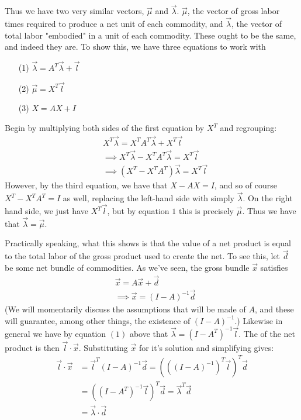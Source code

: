 Thus we have two very similar vectors, $\vec{\mu}$ and $\vec{\lambda}$. $\vec{\mu}$, the vector of gross labor times required to produce a net unit of each commodity, and $\vec{\lambda}$, the vector of total labor "embodied" in a unit of each commodity. These ought to be the same, and indeed they are. To show this, we have three equations to work with
\begin{itemize}
	\item[(1)] $\vec{\lambda} = A^T\vec{\lambda}+\vec{l}$
	\item[(2)] $\vec{\mu} = X^T\vec{l}$
	\item[(3)] $X = AX + I$
\end{itemize}
Begin by multiplying both sides of the first equation by $X^T$ and regrouping:
\begin{align*}
	& X^T\vec{\lambda} = X^TA^T\vec{\lambda} + X^T\vec{l} \\
	&\implies X^T\vec{\lambda} - X^TA^T\vec{\lambda} = X^T\vec{l} \\
	&\implies (X^T-X^TA^T)\vec{\lambda} = X^T\vec{l}
\end{align*}
However, by the third equation, we have that $X-AX = I$, and so of course $X^T - X^TA^T = I$ as well, replacing the left-hand side with simply $\vec{\lambda}$. On the right hand side, we just have $X^T\vec{l}$, but by equation $1$ this is precisely $\vec{\mu}$. Thus we have that $\vec{\lambda} = \vec{\mu}$. \par 
Practically speaking, what this shows is that the value of a net product is equal to the total labor of the gross product used to create the net. To see this, let $\vec{d}$ be some net bundle of commodities. As we've seen, the gross bundle $\vec{x}$ satisfies 
\begin{align*} 
	& \vec{x} = A\vec{x} + \vec{d} \\
	&\implies \vec{x} = (I-A)^{-1}\vec{d}
\end{align*}
(We will momentarily discuss the assumptions that will be made of $A$, and these will guarantee, among other things, the existence of $(I-A)^{-1}$.) Likewise in general we have by equation $(1)$ above that $\vec{\lambda} = (I-A^T)^{-1}\vec{l}$. The of the net product is then $\vec{l} \cdot \vec{x}$. Substituting $\vec{x}$ for it's solution and simplifying gives:
\begin{align*}
	\vec{l} \cdot \vec{x} &= \vec{l}^T(I-A)^{-1}\vec{d} = (((I-A)^{-1})^T\vec{l})^T\vec{d}\\
		&= ((I-A^T)^{-1}\vec{l})^T\vec{d} = \vec{\lambda}^T \vec{d} \\
		&= \vec{\lambda} \cdot \vec{d}
\end{align*}
